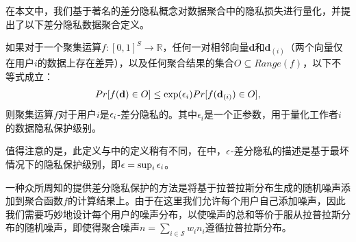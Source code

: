 	在本文中，我们基于著名的差分隐私\cite{Dwork}概念对数据聚合中的隐私损失进行量化，并提出了以下差分隐私数据聚合定义。
	
	\begin{df}[差分隐私数据聚合]
		如果对于一个聚集运算$f:[0,1]^S\rightarrow \mathbb{R}$，任何一对相邻向量$\mathbf{d}$和$\mathbf{d}_{(i)}$（两个向量仅在用户$i$的数据上存在差异），以及任何聚合结果的集合$O\subseteq Range(f)$，以下不等式成立：
		\begin{equation}\label{eq:DP}
		\begin{array}
		[c]{lll}%
		Pr[f(\mathbf{d})\in O]\leq\exp(\e_i)Pr[f(\mathbf{d}_{(i)})\in O],
		\end{array}
		\end{equation}
		则聚集运算$f$对于用户$i$是$\epsilon_i$-差分隐私的。其中$\epsilon_i$是一个正参数，用于量化工作者$i$的数据隐私保护级别。
	\end{df}
	
	值得注意的是，此定义与\cite{Dwork}中的定义稍有不同，在\cite{Dwork}中，$\epsilon$-差分隐私的描述是基于最坏情况下的隐私保护级别，即$\epsilon=\sup_i\epsilon_i$。
	
	一种众所周知的提供差分隐私保护的方法是将基于拉普拉斯分布生成的随机噪声添加到聚合函数$f$的计算结果上\cite{Dwork}。由于在这里我们允许每个用户自己添加噪声，因此我们需要巧妙地设计每个用户的噪声分布，以使噪声的总和等价于服从拉普拉斯分布的随机噪声，即使得聚合噪声$n=\sum_{i\in\mathcal{S}}w_in_i$遵循拉普拉斯分布。
	
